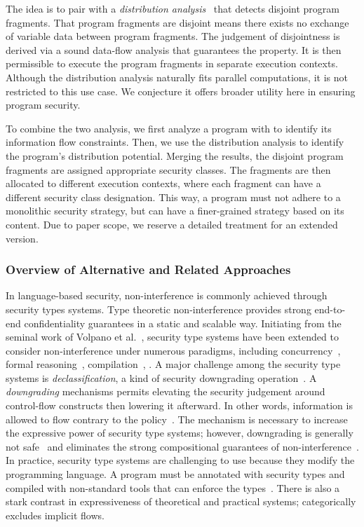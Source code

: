 The idea is to pair \lname with a \emph{distribution
analysis}~\cite{aubert20232} that detects disjoint program fragments. That
program fragments are disjoint means there exists no exchange of variable data
between program fragments. The judgement of disjointness is derived via a sound
data-flow analysis that guarantees the property. It is then permissible to
execute the program fragments in separate execution contexts. Although the
distribution analysis naturally fits parallel computations, it is not restricted
to this use case. We conjecture it offers broader utility here in ensuring
program security.

To combine the two analysis, we first analyze a program with \lname to identify
its information flow constraints. Then, we use the distribution analysis to
identify the program's distribution potential. Merging the results, the disjoint
program fragments are assigned appropriate security classes. The fragments are
then allocated to different execution contexts, where each fragment can have a
different security class designation. This way, a program must not adhere to a
monolithic security strategy, but can have a finer-grained strategy based on its
content. Due to paper scope, we reserve a detailed treatment for an extended
version.

\subsubsection{Overview of Alternative and Related Approaches}\label{sec:related-works}

In language-based security, non-interference is commonly achieved through
security types systems. Type theoretic non-interference provides strong
end-to-end confidentiality guarantees in a static and scalable way. Initiating
from the seminal work of Volpano et al.~\cite{volpanoI1996}, security type
systems have been extended to consider non-interference under numerous
paradigms, including concurrency~\cite{volpano1998,derakhshan2024,frumin2021},
formal reasoning~\cite{nelson2020,frumin2021}, compilation~\cite{barthe2004},
\etc. A major challenge among the security type systems is
\emph{declassification}, a kind of security downgrading
operation~\cite{cecchetti2017}. A \emph{downgrading} mechanisms permits
elevating the security judgement around control-flow constructs then lowering it
afterward. In other words, information is allowed to flow contrary to the
policy~\cite{cecchetti2017}. The mechanism is necessary to increase the
expressive power of security type systems; however, downgrading is generally not
safe~\cite{derakhshan2024} and eliminates the strong compositional guarantees of
non-interference~\cite{cecchetti2017}. In practice, security type systems are
challenging to use because they modify the programming language. A program must
be annotated with security types and compiled with non-standard tools that can
enforce the types~\cite{lamba2024}. There is also a stark contrast in
expressiveness of theoretical and practical systems; \eg \cite{huang2014}
categorically excludes implicit flows.

